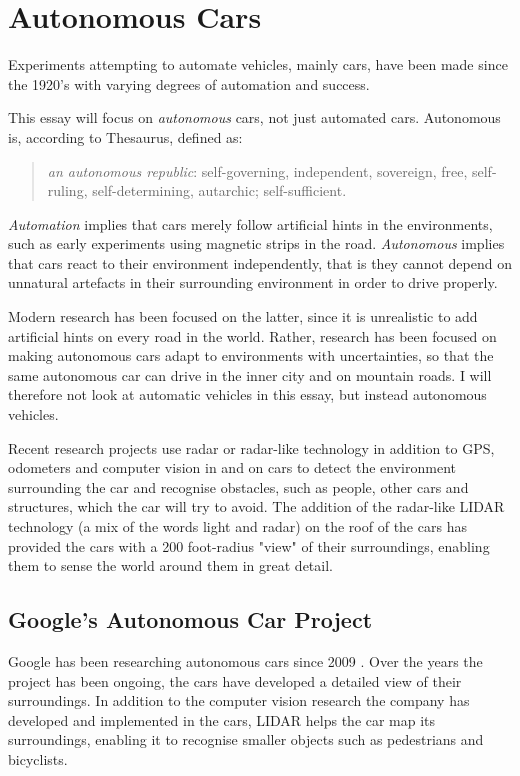 \chapter{Autonomous Cars}

Experiments attempting to automate vehicles, mainly cars, have been made since the 1920's with varying degrees of automation and success. 

This essay will focus on \textit{autonomous} cars, not just automated cars. Autonomous is, according to Thesaurus, defined as: 


\bigskip \blockquote{\textit{an autonomous republic}: self-governing, independent, sovereign, free, self-ruling, self-determining, autarchic; self-sufficient.}

\newpar \textit{Automation} implies that cars merely follow artificial hints in the environments, such as early experiments using magnetic strips in the road. 
\textit{Autonomous} implies that cars react to their environment independently, that is they cannot depend on unnatural artefacts in their surrounding environment in order to drive properly. 

Modern research has been focused on the latter, since it is unrealistic to add artificial hints on every road in the world. Rather, research has been focused on making autonomous cars adapt to environments with uncertainties, so that the same autonomous car can drive in the inner city and on mountain roads. I will therefore not look at automatic vehicles in this essay, but instead autonomous vehicles. 

Recent research projects use radar or radar-like technology in addition to GPS, odometers and computer vision in and on cars to detect the environment surrounding the car and recognise obstacles, such as people, other cars and structures, which the car will try to avoid. The addition of the radar-like LIDAR technology (a mix of the words light and radar) on the roof of the cars has provided the cars with a 200 foot-radius "view" of their surroundings, enabling them to sense the world around them in great detail. 

\section{Google's Autonomous Car Project}
Google has been researching autonomous cars since 2009 . Over the years the project has been ongoing, the cars have developed a detailed view of their surroundings. In addition to the computer vision research the company has developed and implemented in the cars, LIDAR helps the car map its surroundings, enabling it to recognise smaller objects such as pedestrians and bicyclists. 

